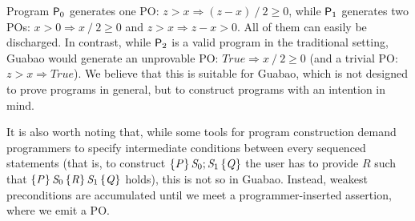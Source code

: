 \documentclass[runningheads]{llncs}
\newcommand{\Conid}[1]{\mathit{#1}}
\newcommand{\Varid}[1]{\mathit{#1}}
\renewcommand{\geq}{\geqslant}
\let\Varid\mathit
\let\Conid\mathit
\begin{document}
Program ${\sf P}_0$ generates one PO: \ensuremath{\Varid{z}\mathbin{>}\Varid{x}\mathrel{\Rightarrow}(\Varid{z}\mathbin{-}\Varid{x})\mathbin{/}\mathrm{2}\geq \mathrm{0}}, while ${\sf P}_1$ generates two POs: \ensuremath{\Varid{x}\mathbin{>}\mathrm{0}\mathrel{\Rightarrow}\Varid{x}\mathbin{/}\mathrm{2}\geq \mathrm{0}} and \ensuremath{\Varid{z}\mathbin{>}\Varid{x}\mathrel{\Rightarrow}\Varid{z}\mathbin{-}\Varid{x}\mathbin{>}\mathrm{0}}.
All of them can easily be discharged.
In contrast, while ${\sf P}_2$ is a valid program in the traditional setting, Guabao would generate an unprovable PO: \ensuremath{\Conid{True}\mathrel{\Rightarrow}\Varid{x}\mathbin{/}\mathrm{2}\geq \mathrm{0}} (and a trivial PO: \ensuremath{\Varid{z}\mathbin{>}\Varid{x}\mathrel{\Rightarrow}\Conid{True}}).
We believe that this is suitable for Guabao, which is not designed to prove programs in general, but to construct programs with an intention in mind.

It is also worth noting that, while some tools for program construction demand programmers to specify intermediate conditions between every sequenced statements (that is, to construct \ensuremath{\htriple{\Conid{P}}{\Conid{S}_{0};\Conid{S}_{1}}{\Conid{Q}}} the user has to provide \ensuremath{\Conid{R}} such that \ensuremath{\htripletwo{\Conid{P}}{\Conid{S}_{0}}{\Conid{R}}{\Conid{S}_{1}}{\Conid{Q}}} holds),
this is not so in Guabao. Instead, weakest preconditions are accumulated until we meet a programmer-inserted assertion, where we emit a PO.
\end{document}
